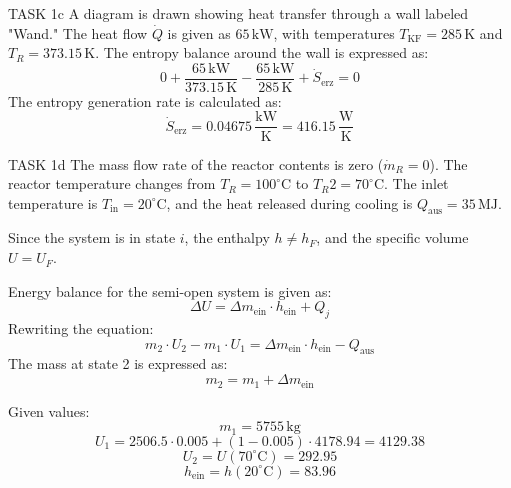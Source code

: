 TASK 1c  
A diagram is drawn showing heat transfer through a wall labeled "Wand." The heat flow \( \dot{Q} \) is given as \( 65 \, \text{kW} \), with temperatures \( T_{\text{KF}} = 285 \, \text{K} \) and \( T_R = 373.15 \, \text{K} \). The entropy balance around the wall is expressed as:  
\[
0 + \frac{65 \, \text{kW}}{373.15 \, \text{K}} - \frac{65 \, \text{kW}}{285 \, \text{K}} + \dot{S}_{\text{erz}} = 0
\]  
The entropy generation rate is calculated as:  
\[
\dot{S}_{\text{erz}} = 0.04675 \, \frac{\text{kW}}{\text{K}} = 416.15 \, \frac{\text{W}}{\text{K}}
\]  

TASK 1d  
The mass flow rate of the reactor contents is zero (\( \dot{m}_R = 0 \)). The reactor temperature changes from \( T_R = 100^\circ\text{C} \) to \( T_R2 = 70^\circ\text{C} \). The inlet temperature is \( T_{\text{in}} = 20^\circ\text{C} \), and the heat released during cooling is \( Q_{\text{aus}} = 35 \, \text{MJ} \).  

Since the system is in state \( i \), the enthalpy \( h \neq h_F \), and the specific volume \( U = U_F \).  

Energy balance for the semi-open system is given as:  
\[
\Delta U = \Delta m_{\text{ein}} \cdot h_{\text{ein}} + Q_j
\]  
Rewriting the equation:  
\[
m_2 \cdot U_2 - m_1 \cdot U_1 = \Delta m_{\text{ein}} \cdot h_{\text{ein}} - Q_{\text{aus}}
\]  
The mass at state 2 is expressed as:  
\[
m_2 = m_1 + \Delta m_{\text{ein}}
\]  

Given values:  
\[
m_1 = 5755 \, \text{kg}
\]  
\[
U_1 = 2506.5 \cdot 0.005 + (1 - 0.005) \cdot 4178.94 = 4129.38
\]  
\[
U_2 = U(70^\circ\text{C}) = 292.95
\]  
\[
h_{\text{ein}} = h(20^\circ\text{C}) = 83.96
\]  